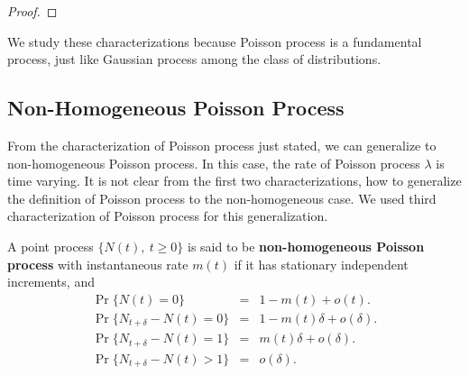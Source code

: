 \documentclass[a4paper,10pt]{article}
\begin{document}
\begin{proof}
\end{proof}

We study these characterizations because Poisson process is a fundamental process, just like Gaussian process among the class of distributions.

\subsection{Non-Homogeneous Poisson Process}
From the characterization of Poisson process just stated, we can generalize to non-homogeneous Poisson process. In this case, the rate of Poisson process $\lambda$ is time varying. It is not clear from the first two characterizations, how to generalize the definition of Poisson process to the non-homogeneous case. We used third characterization of Poisson process for this generalization. 

\begin{defn}\label{defn:NonHomogeneousPoisson} A point process $\{N(t),~t\geqslant 0\}$ is said to be \textbf{non-homogeneous Poisson process} with instantaneous rate $m(t)$ if it has stationary independent increments, and 
 \begin{eqnarray*}\label{eq:NonHomogeneousPoisson}
 \Pr\{N(t)=0\}&=&1-m(t)+o(t). \\
  \Pr\{N_{t+\delta}-N(t)=0\} &=& 1-m(t)\delta+o(\delta). \\
   \Pr\{N_{t+\delta}-N(t)=1\} &=& m(t)\delta+o(\delta). \\
   \Pr\{N_{t+\delta}-N(t)>1\} &=& o(\delta). \\
   \end{eqnarray*}
\end{defn}
\end{document}
